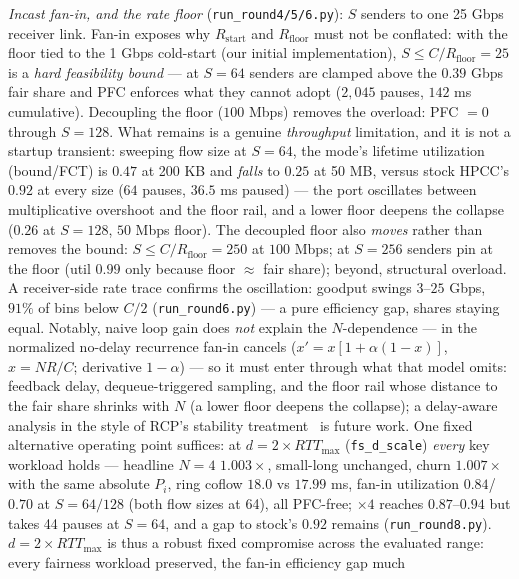 \documentclass[conference]{IEEEtran}
\begin{document}
\emph{Incast fan-in, and the rate floor} (\texttt{run\_round4/5/6.py}): $S$ senders to
one 25 Gbps receiver link. Fan-in
exposes why $R_{\mathrm{start}}$ and $R_{\mathrm{floor}}$ must not be conflated: with the
floor tied to the 1 Gbps cold-start (our initial implementation), $S \le C/R_{\mathrm{floor}}
= 25$ is a \emph{hard feasibility bound} --- at $S{=}64$ senders are clamped above the
$0.39$ Gbps fair share and PFC enforces what they cannot adopt ($2{,}045$
pauses, $142$ ms cumulative). Decoupling the floor ($100$ Mbps) removes the overload: PFC $=0$
through $S{=}128$. What remains is a genuine \emph{throughput} limitation, and it is not a
startup transient: sweeping flow size at $S{=}64$, the mode's lifetime utilization (bound/FCT) is $0.47$ at
200 KB and \emph{falls} to $0.25$ at 50 MB, versus stock HPCC's $0.92$ at every size ($64$
pauses, $36.5$ ms paused) --- the port oscillates between multiplicative overshoot and the
floor rail, and a lower floor deepens the collapse ($0.26$ at $S{=}128$, $50$ Mbps floor).
The decoupled floor also \emph{moves} rather than removes the bound: $S \le
C/R_{\mathrm{floor}} = 250$ at $100$ Mbps; at $S{=}256$ senders pin at the floor (util $0.99$
only because floor ${\approx}$ fair share); beyond, structural overload. A receiver-side rate trace confirms the oscillation: goodput swings $3$--$25$ Gbps, $91\%$
of bins below $C/2$ (\texttt{run\_round6.py}) --- a pure efficiency gap, shares staying
equal. Notably, naive loop gain does \emph{not} explain the $N$-dependence --- in the normalized
no-delay recurrence fan-in cancels ($x' = x[1+\alpha(1-x)]$, $x = NR/C$; derivative
$1-\alpha$) --- so it must enter through what that model omits: feedback delay,
dequeue-triggered sampling, and the floor rail whose distance to the fair share shrinks with
$N$ (a lower floor deepens the collapse); a delay-aware analysis in the style of RCP's
stability treatment~\cite{dukkipati2005processor} is future work.
One fixed alternative operating point suffices: at $d = 2 \times RTT_{\max}$
(\texttt{fs\_d\_scale}) \emph{every} key workload holds ---
headline $N{=}4$ $1.003\times$, small-long unchanged, churn $1.007\times$ with the same
absolute $P_i$, ring coflow $18.0$ vs $17.99$ ms, fan-in utilization $0.84$/$0.70$ at
$S{=}64/128$ (both flow sizes at 64), all PFC-free; $\times 4$ reaches $0.87$--$0.94$ but
takes 44 pauses at $S{=}64$, and a gap to stock's $0.92$ remains
(\texttt{run\_round8.py}). $d = 2 \times RTT_{\max}$ is thus a robust fixed compromise
across the evaluated range: every fairness workload preserved, the fan-in efficiency gap much
\end{document}
